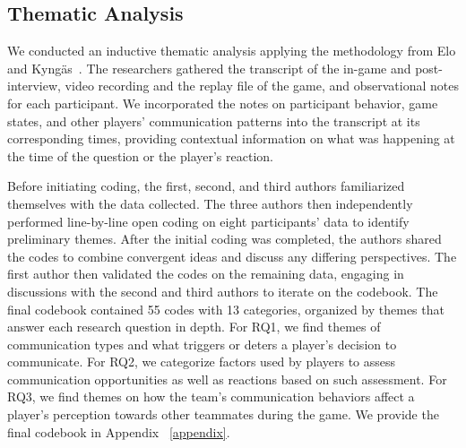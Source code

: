 \subsection{Thematic Analysis}
We conducted an inductive thematic analysis applying the methodology from Elo and  Kyngäs~\cite{elo2008qualitative}. The researchers gathered the transcript of the in-game and post-interview, video recording and the replay file of the game, and observational notes for each participant. We incorporated the notes on participant behavior, game states, and other players' communication patterns into the transcript at its corresponding times, providing contextual information on what was happening at the time of the question or the player's reaction.

Before initiating coding, the first, second, and third authors familiarized themselves with the data collected. The three authors then independently performed line-by-line open coding on eight participants' data to identify preliminary themes. After the initial coding was completed, the authors shared the codes to combine convergent ideas and discuss any differing perspectives. The first author then validated the codes on the remaining data, engaging in discussions with the second and third authors to iterate on the codebook. The final codebook contained 55 codes with 13 categories, organized by themes that answer each research question in depth. For RQ1, we find themes of communication types and what triggers or deters a player's decision to communicate. For RQ2, we categorize factors used by players to assess communication opportunities as well as reactions based on such assessment. For RQ3, we find themes on how the team's communication behaviors affect a player's perception towards other teammates during the game. We provide the final codebook in Appendix ~\ref{appendix}. 